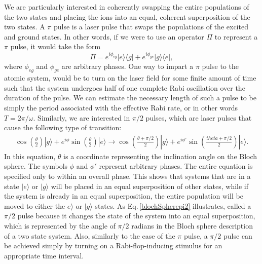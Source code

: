 We are particularly interested in coherently swapping the entire populations of the two states and placing the ions into an equal, coherent superposition of the two states.
A $\pi$ pulse is a laser pulse that swaps the populations of the excited and ground states. In other words, if we were to use an operator $\Pi$ to represent a $\pi$ pulse, it would take the form
\begin{equation}
\Pi=e^{i\phi_{eg}}|e\rangle\langle g|+e^{i\phi_{ge}}|g\rangle\langle e|,
\end{equation}
where $\phi_{eg}$ and $\phi_{ge}$ are arbitrary phases. 
One way to impart a $\pi$ pulse to the atomic system, would be to turn on the laser field for some finite amount of time such that the system undergoes half of one complete Rabi oscillation over the duration of the pulse. We can estimate the necessary length of such a pulse to be simply the period associated with the effective Rabi rate, or in other words $T = 2\pi/\omega$.
Similarly, we are interested in $\pi/2$ pulses, which are laser pulses that cause the following type of transition:
\begin{multline}
\cos\left(\frac{\theta}{2}\right)|g\rangle+
e^{i\phi}\sin\left(\frac{\theta}{2}\right)|e\rangle\rightarrow
\cos\left(\frac{\theta+\pi/2}{2}\right)|g\rangle+
e^{i\phi'}\sin\left(\frac{theta+\pi/2}{2}\right)|e\rangle.\label{blochSpherepi2}
\end{multline}
In this equation, $\theta$ is a coordinate representing the inclination angle on the Bloch sphere. The symbols $\phi$ and $\phi'$ represent arbitrary phases. The entire equation is specified only to within an overall phase. This shows that systems that are in a state $|e\rangle$ or $|g\rangle$ will be placed in an equal superposition of other states, while if the system is already in an equal superposition, the entire population will be moved to either the $e\rangle$ or $|g\rangle$ states.
As Eq.\,\eqref{blochSpherepi2} illustrates, called a $\pi/2$ pulse because it changes the state of the system into an equal superposition, which is represented by the angle of $\pi/2$ radians in the Bloch sphere description of a two state system. Also, similarly to the case of the $\pi$ pulse, a $\pi/2$ pulse can be achieved simply by turning on a Rabi-flop-inducing stimulus for an appropriate time interval. 

